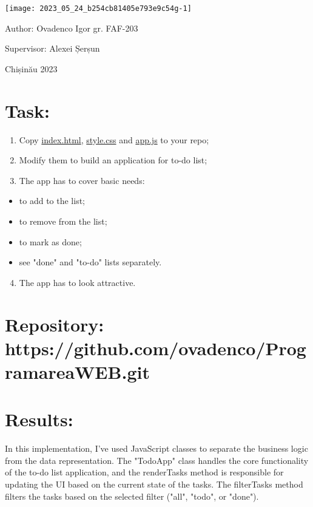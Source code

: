 \documentclass[10pt]{article}
\author{"App for to-do list"}
\date{}
\begin{document}
\begin{center}
\texttt{[image: 2023\_05\_24\_b254cb81405e793e9c54g-1]}
\end{center}

Author: Ovadenco Igor gr. FAF-203

Supervisor: Alexei Șerșun

Chișinău 2023

\section{Task:}
\begin{enumerate}
  \item Copy \href{index.html}{index.html}, \href{style.css}{style.css} and \href{app.js}{app.js} to your repo;

  \item Modify them to build an application for to-do list;

  \item The app has to cover basic needs:

\end{enumerate}

\begin{itemize}
  \item to add to the list;

  \item to remove from the list;

  \item to mark as done;

  \item see "done" and "to-do" lists separately.

\end{itemize}

\begin{enumerate}
  \setcounter{enumi}{3}
  \item The app has to look attractive.
\end{enumerate}

\section{Repository: https://github.com/ovadenco/ProgramareaWEB.git}
\section{Results:}
In this implementation, I've used JavaScript classes to separate the business logic from the data representation. The "TodoApp" class handles the core functionality of the to-do list application, and the renderTasks method is responsible for updating the UI based on the current state of the tasks. The filterTasks method filters the tasks based on the selected filter ("all", "todo", or "done").
\end{document}

